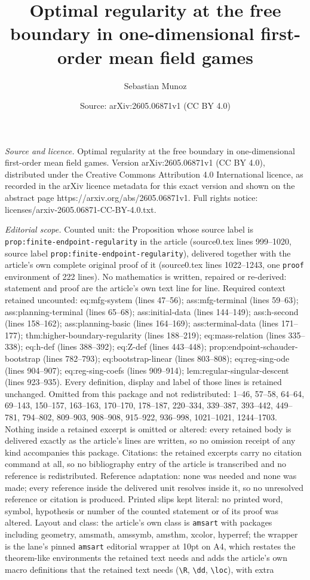 \documentclass[10pt,a4paper]{amsart}
\title[Optimal regularity at the free boundary in one-dimensional f]{Optimal regularity at the free boundary in one-dimensional first-order mean field games}
\author{Sebastian Munoz}
\date{Source: arXiv:2605.06871v1 (CC BY 4.0)}
\begin{document}
\maketitle

\noindent\emph{Source and licence.} Optimal regularity at the free boundary in one-dimensional first-order mean field games. Version arXiv:2605.06871v1 (CC BY 4.0), distributed under the Creative Commons Attribution 4.0 International licence, as recorded in the arXiv licence metadata for this exact version and shown on the abstract page https://arxiv.org/abs/2605.06871v1. Full rights notice: licenses/arxiv-2605.06871-CC-BY-4.0.txt.\par\smallskip

\noindent\textit{Editorial scope.} Counted unit: the Proposition whose source label is \texttt{prop:finite-endpoint-regularity} in the article (source0.tex lines 999--1020, source label \texttt{prop:finite-endpoint-regularity}), delivered together with the article's own complete original proof of it (source0.tex lines 1022--1243, one \texttt{proof} environment of 222 lines). No mathematics is written, repaired or re-derived: statement and proof are the article's own text line for line. Required context retained uncounted: eq:mfg-system (lines 47--56); ass:mfg-terminal (lines 59--63); ass:planning-terminal (lines 65--68); ass:initial-data (lines 144--149); ass:h-second (lines 158--162); ass:planning-basic (lines 164--169); ass:terminal-data (lines 171--177); thm:higher-boundary-regularity (lines 188--219); eq:mass-relation (lines 335--338); eq:h-def (lines 388--392); eq:Z-def (lines 443--448); prop:endpoint-schauder-bootstrap (lines 782--793); eq:bootstrap-linear (lines 803--808); eq:reg-sing-ode (lines 904--907); eq:reg-sing-coefs (lines 909--914); lem:regular-singular-descent (lines 923--935). Every definition, display and label of those lines is retained unchanged. Omitted from this package and not redistributed: 1--46, 57--58, 64--64, 69--143, 150--157, 163--163, 170--170, 178--187, 220--334, 339--387, 393--442, 449--781, 794--802, 809--903, 908--908, 915--922, 936--998, 1021--1021, 1244--1703. Nothing inside a retained excerpt is omitted or altered: every retained body is delivered exactly as the article's lines are written, so no omission receipt of any kind accompanies this package. Citations: the retained excerpts carry no citation command at all, so no bibliography entry of the article is transcribed and no reference is redistributed. Reference adaptation: none was needed and none was made; every reference inside the delivered unit resolves inside it, so no unresolved reference or citation is produced. Printed slips kept literal: no printed word, symbol, hypothesis or number of the counted statement or of its proof was altered. Layout and class: the article's own class is \texttt{amsart} with packages including geometry, amsmath, amssymb, amsthm, xcolor, hyperref; the wrapper is the lane's pinned \texttt{amsart} editorial wrapper at 10pt on A4, which restates the theorem-like environments the retained text needs and adds the article's own macro definitions that the retained text needs (\texttt{\textbackslash R}, \texttt{\textbackslash dd}, \texttt{\textbackslash loc}), with extra 
\end{document}
